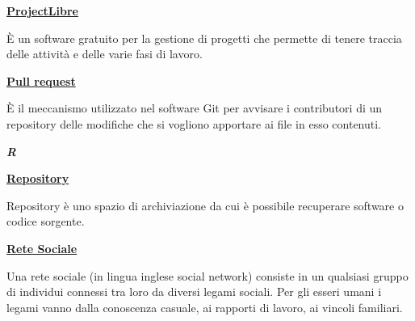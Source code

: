 \bigskip
\begin{addmargin}[0em]{0em}	
	\textbf{\underline{ProjectLibre}} 
\end{addmargin}
	
\medskip
\begin{addmargin}[5em]{1em}	
È un software gratuito per la gestione di progetti che permette di tenere traccia delle attività e delle varie fasi di lavoro.
\end{addmargin}

\bigskip
\begin{addmargin}[0em]{0em}
	\textbf{\underline{Pull request}} 
\end{addmargin}
	
\medskip
\begin{addmargin}[5em]{1em}
È il meccanismo utilizzato nel software Git per avvisare i contributori di un repository delle modifiche che si vogliono apportare ai file in esso contenuti.	
\end{addmargin}	

\newpage
	
\cleardoublepage
{}
{}
\noindent\hrulefill\hspace{4mm}\textbf{\textsl{\Huge{R}}}\hspace{4mm}\hrulefill

\vspace*{2\bigskipamount}

\bigskip
\begin{addmargin}[0em]{0em}	
	\textbf{\underline{Repository}}
\end{addmargin} 

\medskip
\begin{addmargin}[5em]{1em}
Repository è uno spazio di archiviazione da cui è possibile recuperare software o codice sorgente.
\end{addmargin}	

\bigskip
\begin{addmargin}[0em]{0em}	
	\textbf{\underline{Rete Sociale}} 
\end{addmargin}
	
\medskip
\begin{addmargin}[5em]{1em}
Una rete sociale (in lingua inglese social network) consiste in un qualsiasi gruppo di individui connessi tra loro da diversi legami sociali. Per gli esseri umani i legami vanno dalla conoscenza casuale, ai rapporti di lavoro, ai vincoli familiari.
\end{addmargin}	
	
